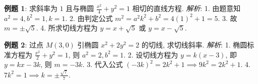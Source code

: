 \begin{examplebox}
\textbf{例题 1}: 求斜率为 $1$ 且与椭圆 $\frac{x^2}{4} + y^2 = 1$ 相切的直线方程.
\textit{解析}: 
1. 由题意知 $a^2=4, b^2=1, k=1$.
2. 由判定公式 $m^2 = a^2k^2 + b^2 = 4(1)^2 + 1 = 5$.
3. 故 $m = \pm \sqrt{5}$.
4. 所求切线方程为 $y = x + \sqrt{5}$ 或 $y = x - \sqrt{5}$.

\textbf{例题 2}: 过点 $M(3, 0)$ 引椭圆 $x^2 + 2y^2 = 2$ 的切线, 求切线斜率.
\textit{解析}:
1. 椭圆标准方程为 $\frac{x^2}{2} + y^2 = 1$, 则 $a^2=2, b^2=1$.
2. 设切线方程为 $y = k(x-3)$, 即 $y = kx - 3k$, 则 $m = -3k$.
3. 代入公式 $(-3k)^2 = 2k^2 + 1 \implies 9k^2 = 2k^2 + 1$.
4. $7k^2 = 1 \implies k = \pm \frac{\sqrt{7}}{7}$.
\end{examplebox}